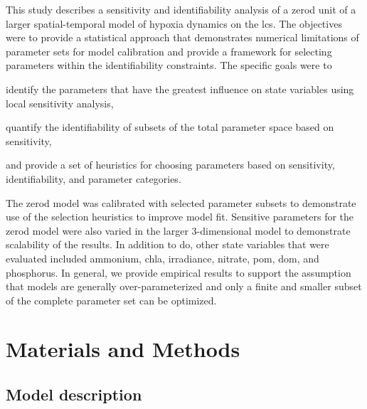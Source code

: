 \documentclass[review]{elsarticle}\usepackage[]{graphicx}\usepackage[]{color}
\begin{document}
This study describes a sensitivity and identifiability analysis of a \ac{zerod} unit of a larger spatial-temporal model of hypoxia dynamics on the \ac{lcs}.  The objectives were to provide a statistical approach that demonstrates numerical limitations of parameter sets for model calibration and provide a framework for selecting parameters within the identifiability constraints.  The specific goals were to \begin{inparaenum}[1\upshape)]
\item identify the parameters that have the greatest influence on state variables using local sensitivity analysis,
\item quantify the identifiability of subsets of the total parameter space based on sensitivity,
\item and provide a set of heuristics for choosing parameters based on sensitivity, identifiability, and parameter categories.
\end{inparaenum}
The \ac{zerod} model was calibrated with selected parameter subsets to demonstrate use of the selection heuristics to improve model fit.  Sensitive parameters for the \ac{zerod} model were also varied in the larger 3-dimensional model to demonstrate scalability of the results. In addition to \ac{do}, other state variables that were evaluated included ammonium, \ac{chla}, irradiance, nitrate, \ac{pom}, \ac{dom}, and phosphorus. In general, we provide empirical results to support the assumption that models are generally over-parameterized and only a finite and smaller subset of the complete parameter set can be optimized.

\section{Materials and Methods}

\subsection{Model description}
\end{document}

